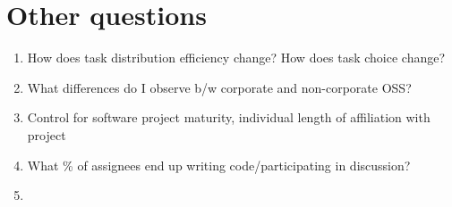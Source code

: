 \documentclass[source/paper/main.tex]{subfiles}
\begin{document}
\section{Other questions}
\begin{enumerate}
    \item How does task distribution efficiency change? How does task choice change?
    \item What differences do I observe b/w corporate and non-corporate OSS?
    \item Control for software project maturity, individual length of affiliation with project
    \item What \% of assignees end up writing code/participating in discussion?
    \item 
\end{enumerate}
\end{document}
